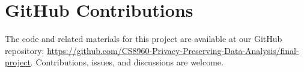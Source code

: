\documentclass{article}
\begin{document}
    
    


\section*{GitHub Contributions}
The code and related materials for this project are available at our GitHub repository: \url{https://github.com/CS8960-Privacy-Preserving-Data-Analysis/final-project}. Contributions, issues, and discussions are welcome.
\end{document}

